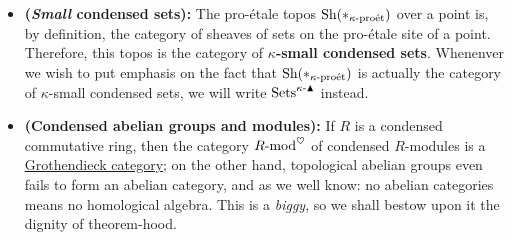             \begin{example}
                \noindent
                \begin{itemize}
                    \item \textbf{(\textit{Small} condensed sets):} The pro-\'etale topos $\mathrm{Sh}(*_{\kappa\text{-}\mathrm{pro\acute{e}t}})$ over a point is, by definition, the category of sheaves of sets on the pro-\'etale site of a point. Therefore, this topos is the category of \textbf{$\kappa$-small condensed sets}. Whenenver we wish to put emphasis on the fact that $\mathrm{Sh}(*_{\kappa\text{-}\mathrm{pro\acute{e}t}})$ is actually the category of $\kappa$-small condensed sets, we will write $\mathrm{Sets}^{\kappa\text{-}\blacktriangle}$ instead.
                    \item \textbf{(Condensed abelian groups and modules):} If $R$ is a condensed commutative ring, then the category $R\text{-}\mathrm{mod}^{\heartsuit}$ of condensed $R$-modules is a \href{https://ncatlab.org/nlab/show/Grothendieck+category}{\underline{Grothendieck category}}; on the other hand, topological abelian groups even fails to form an abelian category, and as we well know: no abelian categories means no homological algebra. This is a \textit{biggy}, so we shall bestow upon it the dignity of theorem-hood.
                \end{itemize}
            \end{example}
